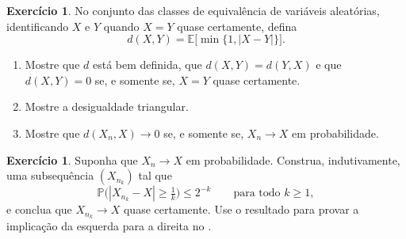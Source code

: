 \documentclass[12pt,portuguese]{article}
\theoremstyle{definition}
\theoremstyle{plainexercise}
\theoremstyle{starredexercise}
\newtheorem{starredexercise}[exercise]{Exercício}
\theoremstyle{definition}
\begin{document}
\begin{starredexercise}\label{exercise:metrica-prob}
No conjunto das classes de equivalência de variáveis aleatórias, identificando
$X$ e $Y$ quando $X=Y$ quase certamente, defina
\[
d(X,Y)=\mathbb{E}\bigl[\min\{1,|X-Y|\}\bigr].
\]
\begin{enumerate}
\item[(a)] Mostre que $d$ está bem definida, que $d(X,Y)=d(Y,X)$ e que
$d(X,Y)=0$ se, e somente se, $X=Y$ quase certamente.
\item[(b)] Mostre a desigualdade triangular.
\item[(c)] Mostre que $d(X_n,X)\to0$ se, e somente se, $X_n\to X$ em
probabilidade.
\end{enumerate}
\end{starredexercise}

\begin{starredexercise}\label{exercise:subsequencia-qc}
Suponha que $X_n\to X$ em probabilidade. Construa, indutivamente, uma
subsequência $(X_{n_k})$ tal que
\[
\mathbb{P}\bigl(|X_{n_k}-X|\geqslant\tfrac{1}{k}\bigr)\leqslant2^{-k}
\qquad\text{para todo }k\geqslant1,
\]
e conclua que $X_{n_k}\to X$ quase certamente. Use o resultado para provar a
implicação da esquerda para a direita no .
\end{starredexercise}



\end{document}
